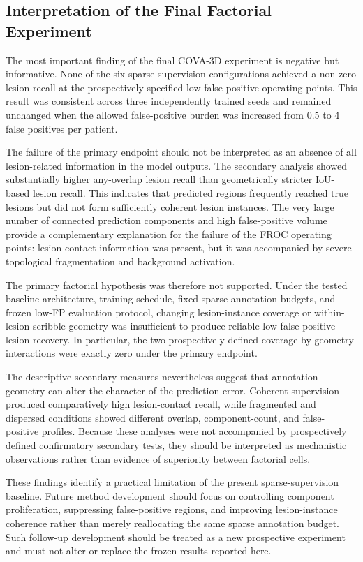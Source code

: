 \subsection{Interpretation of the Final Factorial Experiment}

The most important finding of the final COVA-3D experiment is negative but
informative. None of the six sparse-supervision configurations achieved a
non-zero lesion recall at the prospectively specified low-false-positive
operating points. This result was consistent across three independently trained
seeds and remained unchanged when the allowed false-positive burden was
increased from 0.5 to 4 false positives per patient.

The failure of the primary endpoint should not be interpreted as an absence of
all lesion-related information in the model outputs. The secondary analysis
showed substantially higher any-overlap lesion recall than geometrically stricter
IoU-based lesion recall. This indicates that predicted regions frequently reached
true lesions but did not form sufficiently coherent lesion instances. The very
large number of connected prediction components and high false-positive volume
provide a complementary explanation for the failure of the FROC operating
points: lesion-contact information was present, but it was accompanied by severe
topological fragmentation and background activation.

The primary factorial hypothesis was therefore not supported. Under the tested
baseline architecture, training schedule, fixed sparse annotation budgets, and
frozen low-FP evaluation protocol, changing lesion-instance coverage or
within-lesion scribble geometry was insufficient to produce reliable
low-false-positive lesion recovery. In particular, the two prospectively defined
coverage-by-geometry interactions were exactly zero under the primary endpoint.

The descriptive secondary measures nevertheless suggest that annotation geometry
can alter the character of the prediction error. Coherent supervision produced
comparatively high lesion-contact recall, while fragmented and dispersed
conditions showed different overlap, component-count, and false-positive
profiles. Because these analyses were not accompanied by prospectively defined
confirmatory secondary tests, they should be interpreted as mechanistic
observations rather than evidence of superiority between factorial cells.

These findings identify a practical limitation of the present sparse-supervision
baseline. Future method development should focus on controlling component
proliferation, suppressing false-positive regions, and improving lesion-instance
coherence rather than merely reallocating the same sparse annotation budget.
Such follow-up development should be treated as a new prospective experiment and
must not alter or replace the frozen results reported here.
